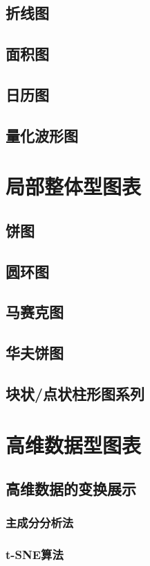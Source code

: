 \documentclass[openany]{progbookcn}
\begin{document}
\subsection{折线图}
\subsection{面积图}
\subsection{日历图}
\subsection{量化波形图}

\section{局部整体型图表}
\subsection{饼图}
\subsection{圆环图}
\subsection{马赛克图}
\subsection{华夫饼图}
\subsection{块状/点状柱形图系列}

\section{高维数据型图表}
\subsection{高维数据的变换展示}
\subsubsection{主成分分析法}
\subsubsection{t-SNE算法}
\end{document}
